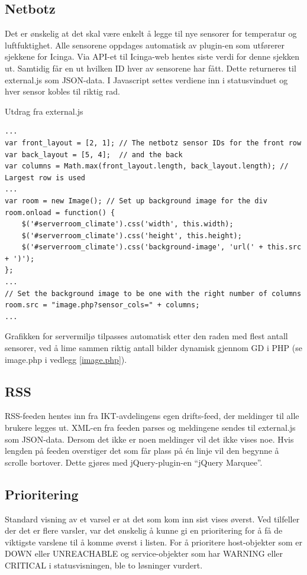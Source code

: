 \subsection{Netbotz}
Det er ønskelig at det skal være enkelt å legge til nye sensorer for temperatur og luftfuktighet. Alle sensorene oppdages automatisk av plugin-en som utførerer sjekkene for Icinga. Via API-et til Icinga-web hentes siste verdi for denne sjekken ut. Samtidig får en ut hvilken ID hver av sensorene har fått. Dette returneres til external.js som JSON-data. I Javascript settes verdiene inn i statusvinduet og hver sensor kobles til riktig rad.

Utdrag fra external.js
\begin{lstlisting}[style=example]
...
var front_layout = [2, 1]; // The netbotz sensor IDs for the front row
var back_layout = [5, 4];  // and the back
var columns = Math.max(front_layout.length, back_layout.length); // Largest row is used 
...
var room = new Image(); // Set up background image for the div
room.onload = function() {
    $('#serverroom_climate').css('width', this.width);
    $('#serverroom_climate').css('height', this.height);
    $('#serverroom_climate').css('background-image', 'url(' + this.src + ')');
};
...
// Set the background image to be one with the right number of columns
room.src = "image.php?sensor_cols=" + columns;
...
\end{lstlisting}

Grafikken for servermiljø tilpasses automatisk etter den raden med flest antall sensorer, ved å lime sammen riktig antall bilder dynamisk gjennom GD i PHP (se image.php i vedlegg \ref{image.php}).

\subsection{RSS}
RSS-feeden hentes inn fra IKT-avdelingens egen drifts-feed, der meldinger til alle brukere legges ut. XML-en fra feeden parses og meldingene sendes til external.js som JSON-data. Dersom det ikke er noen meldinger vil det ikke vises noe. Hvis lengden på feeden overstiger det som får plass på én linje vil den begynne å scrolle bortover. Dette gjøres med jQuery-plugin-en ``jQuery Marquee''\cite{jqmarquee}.

\subsection{Prioritering}
Standard visning av et varsel er at det som kom inn sist vises øverst. Ved tilfeller der det er flere varsler, var det ønskelig å kunne gi en prioritering for å få de viktigste varslene til å komme øverst i listen. For å prioritere host-objekter som er DOWN eller UNREACHABLE og service-objekter som har WARNING eller CRITICAL i statusvisningen, ble to løsninger vurdert. 

